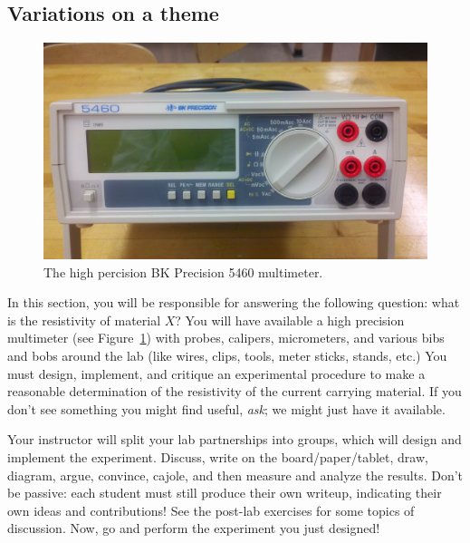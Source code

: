 \documentclass[12pt]{article}
\begin{document}
\subsection{Variations on a theme}
\label{sec:variations}

\begin{figure}
  \centering
  \includegraphics[width=2\textwidth/3]{figures/bk_5460}
  \caption{The high percision BK Precision 5460 multimeter.}
  \label{fig:multimeter}
\end{figure}
In this section, you will be responsible for answering the following
question: what is the resistivity of material $X$?  You will have
available a high precision multimeter (see
Figure~\ref{fig:multimeter}) with probes, calipers, micrometers, and
various bibs and bobs around the lab (like wires, clips, tools, meter
sticks, stands, etc.)  You must design, implement, and critique an
experimental procedure to make a reasonable determination of the
resistivity of the current carrying material.  If you don't see
something you might find useful, \textit{ask}; we might just have it
available.

Your instructor will split your lab partnerships into groups, which
will design and implement the experiment.  Discuss, write on the
board/paper/tablet, draw, diagram, argue, convince, cajole, and then
measure and analyze the results.  Don't be passive: each student must
still produce their own writeup, indicating their own ideas and
contributions!  See the post-lab exercises for some topics of
discussion.  Now, go and perform the experiment you just designed!
\end{document}
